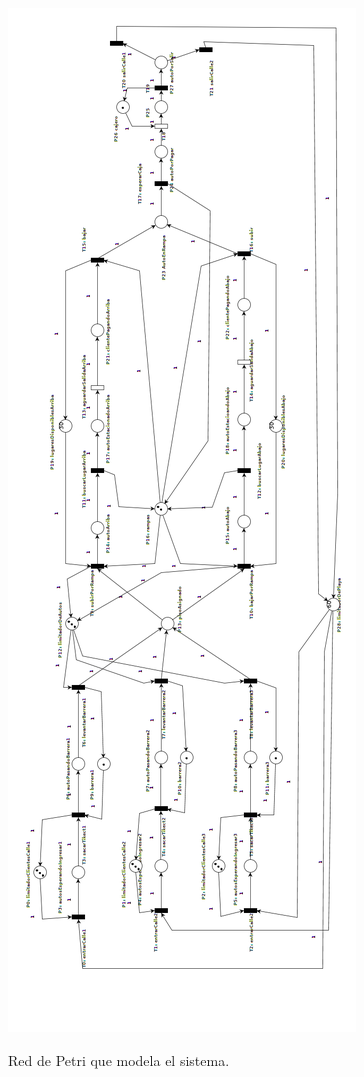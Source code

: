 \documentclass[12pt,a4paper]{article}
\begin{document}
\begin{figure}[H]
    \centering
    \includegraphics[scale=0.35]{estacionamiento_2019}
    \label{fig:rdp}
    \caption{Red de Petri que modela el sistema.}
\end{figure}
\end{document}
